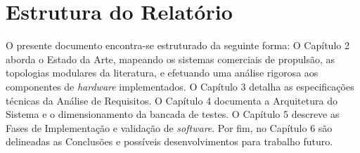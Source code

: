 \section{Estrutura do Relatório}
O presente documento encontra-se estruturado da seguinte forma: 
O Capítulo 2 aborda o Estado da Arte, mapeando os sistemas comerciais de propulsão, as topologias modulares da literatura, e efetuando uma análise rigorosa aos componentes de \textit{hardware} implementados. O Capítulo 3 detalha as especificações técnicas da Análise de Requisitos. O Capítulo 4 documenta a Arquitetura do Sistema e o dimensionamento da bancada de testes. O Capítulo 5 descreve as Fases de Implementação e validação de \textit{software}. Por fim, no Capítulo 6 são delineadas as Conclusões e possíveis desenvolvimentos para trabalho futuro.
